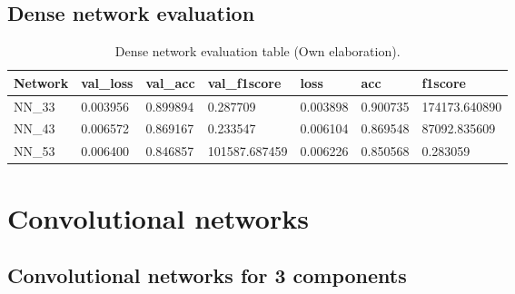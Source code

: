 \subsection{Dense network evaluation}

\begin{table}[H]
\centering
\begin{tabular}{|l|l|l|l|l|l|l|}
\hline
\textbf{Network} & \textbf{val\_loss} & \textbf{val\_acc} & \textbf{val\_f1score} & \textbf{loss} & \textbf{acc} & \textbf{f1score} \\ \hline
NN\_33 & 0.003956 & 0.899894 & 0.287709 & 0.003898 & 0.900735 & 174173.640890 \\ \hline
NN\_43 & 0.006572 & 0.869167 & 0.233547 & 0.006104 & 0.869548 & 87092.835609 \\ \hline
NN\_53 & 0.006400 & 0.846857 & 101587.687459 & 0.006226 & 0.850568 & 0.283059 \\ \hline
\end{tabular}
\caption{Dense network evaluation table (Own elaboration).}
\label{table:evaluacion_nn}
\end{table}

\section{Convolutional networks}

\subsection{Convolutional networks for 3 components}

